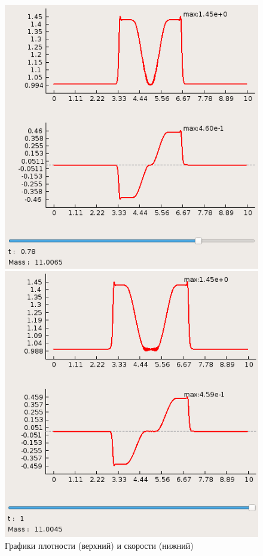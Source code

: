 \documentclass[a4paper, 11pt]{article}
\begin{document}
\begin{figure}[h]
\begin{minipage}[H] {0.49\linewidth}
	\end{minipage}
	\begin{minipage}[H] {0.49\linewidth}
		\includegraphics[width=1\linewidth]{p1/p1_t=0,78.png}
	\end{minipage}
	\begin{minipage}[H] {0.49\linewidth}
		\includegraphics[width=1\linewidth]{p1/p1_t=1.png}
	\end{minipage}
	\caption{Графики плотности (верхний) и скорости (нижний)}
\end{figure}
\end{document}
